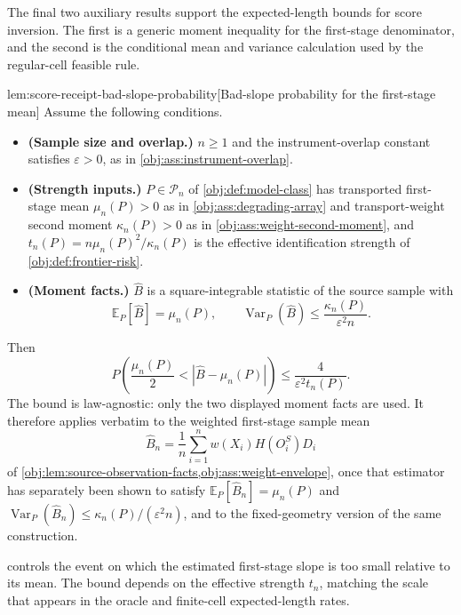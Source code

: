 The final two auxiliary results support the expected-length bounds for score inversion. The first is a generic moment inequality for the first-stage denominator, and the second is the conditional mean and variance calculation used by the regular-cell feasible rule.

\begin{lemmav}{lem:score-receipt-bad-slope-probability}[Bad-slope probability for the first-stage mean]
Assume the following conditions.
\begin{itemize}
\item \textbf{(Sample size and overlap.)} \(n\ge1\) and the instrument-overlap constant satisfies \(\varepsilon>0\), as in \cref{obj:ass:instrument-overlap}.
\item \textbf{(Strength inputs.)} \(P\in\mathcal P_n\) of \cref{obj:def:model-class} has transported first-stage mean \(\mu_n(P)>0\) as in \cref{obj:ass:degrading-array} and transport-weight second moment \(\kappa_n(P)>0\) as in \cref{obj:ass:weight-second-moment}, and \(t_n(P)=n\mu_n(P)^2/\kappa_n(P)\) is the effective identification strength of \cref{obj:def:frontier-risk}.
\item \textbf{(Moment facts.)} \(\widehat B\) is a square-integrable statistic of the source sample with
\[
\mathbb E_P[\widehat B]=\mu_n(P),
\qquad
\operatorname{Var}_P(\widehat B)\le\frac{\kappa_n(P)}{\varepsilon^2n}.
\]
\end{itemize}
Then
\[
P\!\left(\frac{\mu_n(P)}2<\left|\widehat B-\mu_n(P)\right|\right)\le\frac{4}{\varepsilon^2t_n(P)} .
\]
The bound is law-agnostic: only the two displayed moment facts are used. It therefore applies verbatim to the weighted first-stage sample mean
\[
\widehat B_n=\frac1n\sum_{i=1}^nw(X_i)H(O_i^S)D_i
\]
of \cref{obj:lem:source-observation-facts,obj:ass:weight-envelope}, once that estimator has separately been shown to satisfy \(\mathbb E_P[\widehat B_n]=\mu_n(P)\) and \(\operatorname{Var}_P(\widehat B_n)\le\kappa_n(P)/(\varepsilon^2n)\), and to the fixed-geometry version of the same construction.
\end{lemmav}

 controls the event on which the estimated first-stage slope is too small relative to its mean. The bound depends on the effective strength \(t_n\), matching the scale that appears in the oracle and finite-cell expected-length rates.

